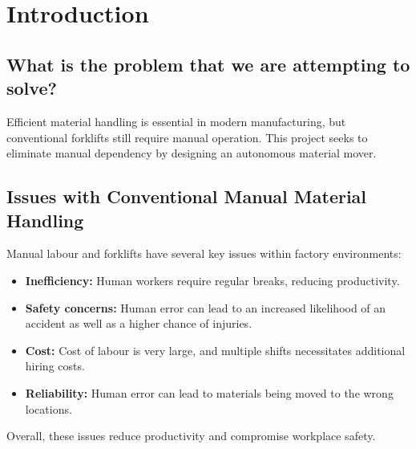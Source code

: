 \documentclass[12pt,titlepage]{article}
\begin{document}
\vspace{2em}

\section{Introduction}
\subsection{What is the problem that we are attempting to solve?}
Efficient material handling is essential in modern manufacturing, but conventional forklifts still require manual operation. This project seeks to eliminate manual dependency by designing an autonomous material mover.
 
\subsection{Issues with Conventional Manual Material Handling}

Manual labour and forklifts have several key issues within factory environments:

\begin{itemize}
    \item \textbf{Inefficiency:} Human workers require regular breaks, reducing productivity.
    \item \textbf{Safety concerns:} Human error can lead to an increased likelihood of an accident as well as a higher chance of injuries.
    \item \textbf{Cost:} Cost of labour is very large, and multiple shifts necessitates additional hiring costs.
    \item \textbf{Reliability:} Human error can lead to materials being moved to the wrong locations.
\end{itemize}

Overall, these issues reduce productivity and compromise workplace safety.
\end{document}

